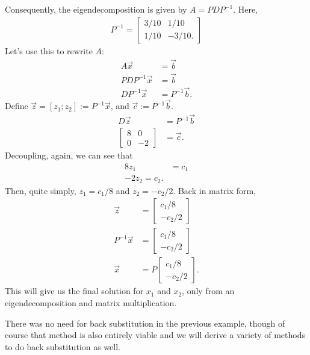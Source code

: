\documentclass{ximera}
\begin{document}
\begin{example}
Consequently, the eigendecomposition is given by $A = PDP^{-1}$.  Here,
\begin{align}
    P^{-1} = \begin{bmatrix}
        3/10 & 1/10 \\ 1/10 & -3/10.
    \end{bmatrix}
\end{align}
Let's use this to rewrite $A$:
\begin{align}
    A\vec{x} &= \vec{b} \\
    PDP^{-1}\vec{x} &= \vec{b} \\
    DP^{-1}\vec{x} &= P^{-1}\vec{b}.
\end{align}
Define $\vec{z} = [z_1;z_2]:= P^{-1}\vec{x}$, and $\vec{c}:=P^{-1}\vec{b}$.
\begin{align}
    D \vec{z} &= P^{-1}\vec{b} \\
    \begin{bmatrix} 8 & 0 \\ 0 &-2 \end{bmatrix} &= \vec{c}.
\end{align}
Decoupling, again, we can see that
\begin{align}
    8z_1 &= c_1 \\
    -2z_2 = c_2.
\end{align}
Then, quite simply, $z_1 = c_1/8$ and $z_2 = -c_2/2$.  Back in matrix form,
\begin{align}
    \vec{z} &= \begin{bmatrix}
        c_1/8 \\ -c_2/2
    \end{bmatrix}
    \\
    P^{-1}\vec{x} &=  \begin{bmatrix}
        c_1/8 \\ -c_2/2
    \end{bmatrix}
    \\
    \vec{x} &= P \begin{bmatrix}
        c_1/8 \\ -c_2/2
    \end{bmatrix}.
\end{align}
This will give us the final solution for $x_1$ and $x_2$, only from an eigendecomposition and matrix multiplication.  
\end{example}
There was no need for back substitution in the previous example, though of course that method is also entirely viable and we will derive a variety of methods to do back substitution as well.
\end{document}
